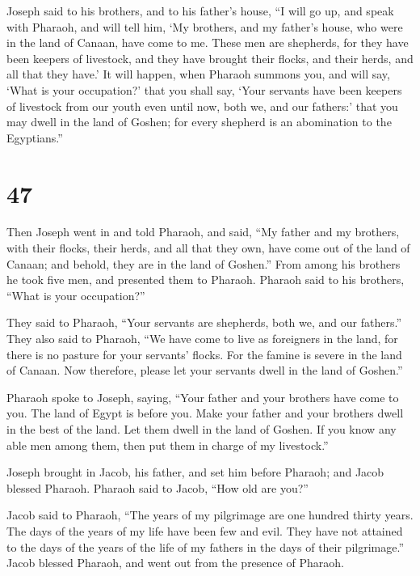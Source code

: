  Joseph said to his brothers, and to his father's house,
``I will go up, and speak with Pharaoh, and will tell him, `My brothers,
and my father's house, who were in the land of Canaan, have come to me.
 These men are shepherds, for they have been keepers of
livestock, and they have brought their flocks, and their herds, and all
that they have.'  It will happen, when Pharaoh summons you,
and will say, `What is your occupation?'  that you shall
say, `Your servants have been keepers of livestock from our youth even
until now, both we, and our fathers:' that you may dwell in the land of
Goshen; for every shepherd is an abomination to the Egyptians.''

\hypertarget{section-46}{%
\section{47}\label{section-46}}

 Then Joseph went in and told Pharaoh, and said, ``My father
and my brothers, with their flocks, their herds, and all that they own,
have come out of the land of Canaan; and behold, they are in the land of
Goshen.''  From among his brothers he took five men, and
presented them to Pharaoh.  Pharaoh said to his brothers,
``What is your occupation?''

They said to Pharaoh, ``Your servants are shepherds, both we, and our
fathers.''  They also said to Pharaoh, ``We have come to
live as foreigners in the land, for there is no pasture for your
servants' flocks. For the famine is severe in the land of Canaan. Now
therefore, please let your servants dwell in the land of Goshen.''

 Pharaoh spoke to Joseph, saying, ``Your father and your
brothers have come to you.  The land of Egypt is before you.
Make your father and your brothers dwell in the best of the land. Let
them dwell in the land of Goshen. If you know any able men among them,
then put them in charge of my livestock.''

 Joseph brought in Jacob, his father, and set him before
Pharaoh; and Jacob blessed Pharaoh.  Pharaoh said to Jacob,
``How old are you?''

 Jacob said to Pharaoh, ``The years of my pilgrimage are one
hundred thirty years. The days of the years of my life have been few and
evil. They have not attained to the days of the years of the life of my
fathers in the days of their pilgrimage.''  Jacob blessed
Pharaoh, and went out from the presence of Pharaoh.

